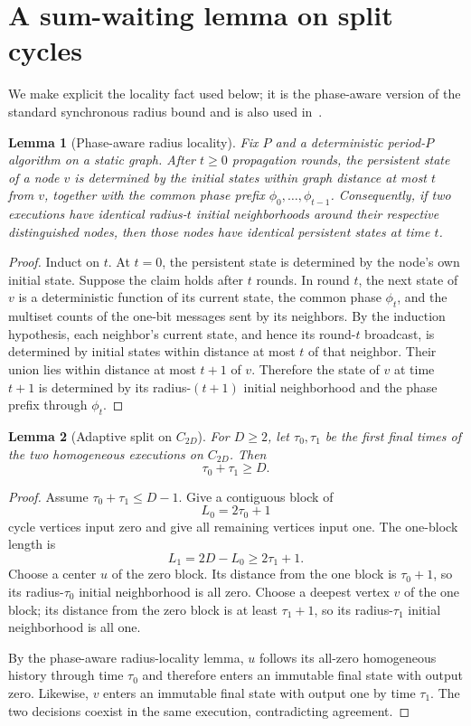\documentclass[11pt]{article}
\newtheorem{lemma}{Lemma}
\theoremstyle{remark}
\begin{document}
\section{A sum-waiting lemma on split cycles}

We make explicit the locality fact used below; it is the phase-aware version of the standard synchronous radius bound and is also used in~\cite{yonezu2026statephase}.

\begin{lemma}[Phase-aware radius locality]
Fix $P$ and a deterministic period-$P$ algorithm on a static graph.  After $t\ge0$ propagation rounds, the persistent state of a node $v$ is determined by the initial states within graph distance at most $t$ from $v$, together with the common phase prefix $\phi_0,\ldots,\phi_{t-1}$.  Consequently, if two executions have identical radius-$t$ initial neighborhoods around their respective distinguished nodes, then those nodes have identical persistent states at time $t$.
\end{lemma}

\begin{proof}
Induct on $t$.  At $t=0$, the persistent state is determined by the node's own initial state.  Suppose the claim holds after $t$ rounds.  In round $t$, the next state of $v$ is a deterministic function of its current state, the common phase $\phi_t$, and the multiset counts of the one-bit messages sent by its neighbors.  By the induction hypothesis, each neighbor's current state, and hence its round-$t$ broadcast, is determined by initial states within distance at most $t$ of that neighbor.  Their union lies within distance at most $t+1$ of $v$.  Therefore the state of $v$ at time $t+1$ is determined by its radius-$(t+1)$ initial neighborhood and the phase prefix through $\phi_t$.
\end{proof}

\begin{lemma}[Adaptive split on $C_{2D}$]
For $D\ge2$, let $\tau_0,\tau_1$ be the first final times of the two homogeneous executions on $C_{2D}$.  Then
\[
\tau_0+\tau_1\ge D.
\]
\end{lemma}

\begin{proof}
Assume $\tau_0+\tau_1\le D-1$.  Give a contiguous block of
\[
L_0=2\tau_0+1
\]
cycle vertices input zero and give all remaining vertices input one.  The one-block length is
\[
L_1=2D-L_0\ge2\tau_1+1.
\]
Choose a center $u$ of the zero block.  Its distance from the one block is $\tau_0+1$, so its radius-$\tau_0$ initial neighborhood is all zero.  Choose a deepest vertex $v$ of the one block; its distance from the zero block is at least $\tau_1+1$, so its radius-$\tau_1$ initial neighborhood is all one.

By the phase-aware radius-locality lemma, $u$ follows its all-zero homogeneous history through time $\tau_0$ and therefore enters an immutable final state with output zero.  Likewise, $v$ enters an immutable final state with output one by time $\tau_1$.  The two decisions coexist in the same execution, contradicting agreement.
\end{proof}
\end{document}

